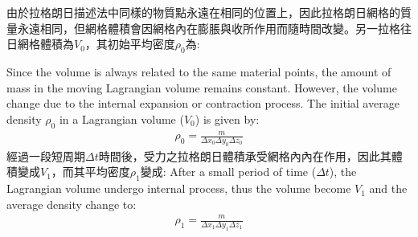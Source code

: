 由於拉格朗日描述法中同樣的物質點永遠在相同的位置上，因此拉格朗日網格的質量永遠相同，但網格體積會因網格內在膨脹與收所作用而隨時間改變。另一拉格往日網格體積為$V_0$，其初始平均密度$\rho_0$為:


Since the volume is always related to the same material points, the amount of mass in the moving Lagrangian volume remains constant. However, the volume change due to the internal expansion or contraction process. The initial average density $\rho_0$ in a Lagrangian volume ($V_0$) is given by:
\begin{align}
\rho_0 = \frac{m}{\Delta x_0 \Delta y_0 \Delta z_0}
\end{align}
經過一段短周期$\Delta t$時間後，受力之拉格朗日體積承受網格內內在作用，因此其體積變成$V_1$，而其平均密度$\rho_1$變成:
After a small period of time ($\Delta t$), the Lagrangian volume undergo internal process, thus the volume become $V_1$ and the average density change to:
\begin{align}
\rho_1 = \frac{m}{\Delta x_1 \Delta y_1 \Delta z_1}
\end{align}

